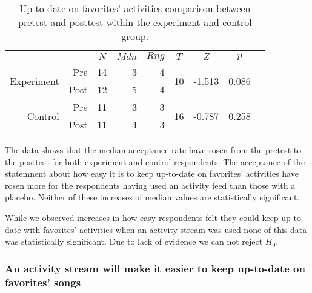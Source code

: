 \begin{table}
  \begin{tabular}{rrrrrrrrr}

    &
    &
    \multicolumn{1}{c}{$N$} &
    \multicolumn{1}{c}{$Mdn$} &
    \multicolumn{1}{c}{$Rng$} &
    \multicolumn{1}{c}{$T$} &
    \multicolumn{1}{c}{$Z$} &
    \multicolumn{1}{c}{$p$} \\

    \cmidrule(lr){3-8}

    \multirow{2}{*}{Experiment} &
    Pre &
    14 &
    3 &
    4 &
    \multirow{2}{*}{10} &
    \multirow{2}{*}{-1.513} &
    \multirow{2}{*}{0.086}\\

    &
    Post &
    12 &
    5 &
    4 &
    &
    \\

    \cmidrule(lr){2-8}

    \multirow{2}{*}{Control} &
    Pre &
    11 &
    3 &
    3 &
    \multirow{2}{*}{16} &
    \multirow{2}{*}{-0.787} &
    \multirow{2}{*}{0.258}\\

    &
    Post &
    11 &
    4 &
    3 &
    &
    \\

  \end{tabular}
  \caption[Up-to-date on Favorites' Activities, Within Groups]{%
    Up-to-date on favorites' activities  comparison between
    pretest and posttest within the experiment and control group.
  }
  \label{table:uptodate.favorite.activities.within}
\end{table}

The data shows that the median acceptance rate have rosen from the pretest to
the posttest for both experiment and control respondents. The acceptance of
the statemnent about how easy it is to keep up-to-date on favorites'
activities have rosen more for the respondents having used an activity feed
than those with a placebo. Neither of these increases of median values
are statistically significant.

While we observed increases in how easy respondents felt they could keep
up-to-date with favorites' activities when an activity stream was used none of
this data was statistically significant. Due to lack of evidence we can not
reject $H_0$.

\subsubsection{An activity stream will make it easier to keep up-to-date on
  favorites' songs}

